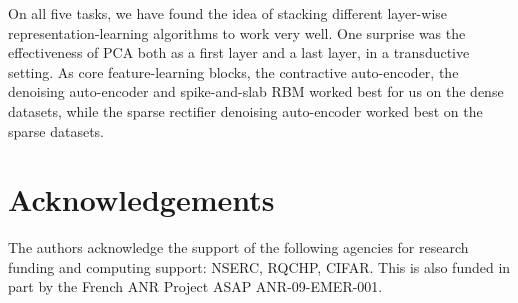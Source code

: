 On all five tasks, we have found the idea of stacking different layer-wise
representation-learning algorithms to work very well. One surprise was the
effectiveness of PCA both as a first layer and a last layer, in a transductive
setting. As core feature-learning blocks, the contractive auto-encoder, the
denoising auto-encoder and spike-and-slab RBM worked best for us on the dense
datasets, while the sparse rectifier denoising auto-encoder worked best on the
sparse datasets.

%

\section*{Acknowledgements}

The authors acknowledge the support of the following agencies for research
funding and computing support: NSERC, RQCHP, CIFAR. This is also funded in part by
the French ANR Project ASAP ANR-09-EMER-001.


%
%

%
